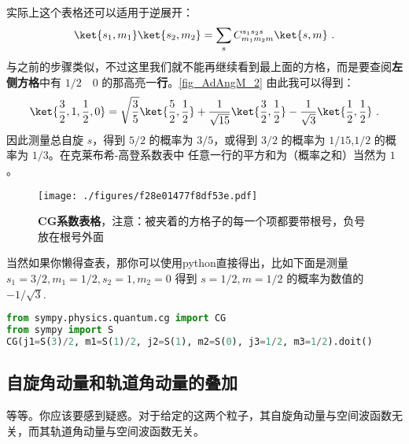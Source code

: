 实际上这个表格还可以适用于逆展开：
\begin{equation}
\ket{s_1,m_1}\ket{s_2,m_2}=\sum_{s}C^{s_1s_2s}_{m_1m_2m}\ket{s,m}~.
\end{equation}
与之前的步骤类似，不过这里我们就不能再继续看到最上面的方格，而是要查阅\textbf{左侧方格}中有 $1/2\quad 0$ 的那高亮一\textbf{行}。\autoref{fig_AdAngM_2} 
由此我可以得到：
\begin{equation}
\ket{\frac{3}{2},1,\frac{1}{2},0}=\sqrt{\frac{3}{5}}\ket{\frac{5}{2},\frac{1}{2}}+\frac{1}{\sqrt{15}}\ket{\frac{3}{2},\frac{1}{2}}-\frac{1}{\sqrt{3}}\ket{\frac{1}{2},\frac{1}{2}}~.
\end{equation}
因此测量总自旋 $s$，得到 $5/2$ 的概率为 $3/5$，或得到 $3/2$ 的概率为 $1/15$,$1/2$ 的概率为 $1/3$。在克莱布希-高登系数表中
任意一行的平方和为（概率之和）当然为 $1$。
\begin{figure}[ht]
\centering
\texttt{[image: ./figures/f28e01477f8df53e.pdf]}
\caption{\textbf{CG系数表格}，注意：被夹着的方格子的每一个项都要带根号，负号放在根号外面} \label{fig_AdAngM_1}
\end{figure}

当然如果你懒得查表，那你可以使用python直接得出，比如下面是测量 $s_1=3/2,m_1=1/2,s_2=1,m_2=0$ 得到 $s=1/2,m=1/2$ 的概率为数值的 $-1/\sqrt{3}$.
\begin{lstlisting}[language=python]
from sympy.physics.quantum.cg import CG
from sympy import S
CG(j1=S(3)/2, m1=S(1)/2, j2=S(1), m2=S(0), j3=1/2, m3=1/2).doit()
\end{lstlisting}

\subsection{自旋角动量和轨道角动量的叠加}
等等。你应该要感到疑惑。对于给定的这两个粒子，其自旋角动量与空间波函数无关，而其轨道角动量与空间波函数无关。
